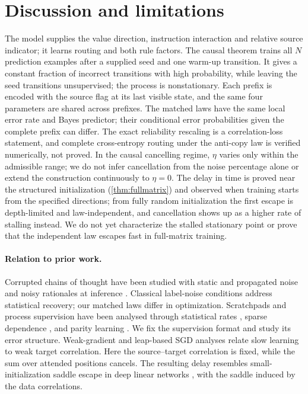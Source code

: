 \section{Discussion and limitations}
\label{sec:scope}
The model supplies the value direction, instruction interaction and relative source indicator; it learns routing and both rule factors.
The causal theorem trains all $N$ prediction examples after a supplied seed and one warm-up transition.
It gives a constant fraction of incorrect transitions with high probability, while leaving the seed transitions unsupervised; the process is nonstationary.
Each prefix is encoded with the source flag at its last visible state, and the same four parameters are shared across prefixes.
The matched laws have the same local error rate and Bayes predictor; their conditional error probabilities given the complete prefix can differ.
The exact reliability rescaling is a correlation-loss statement, and complete cross-entropy routing under the anti-copy law is verified numerically, not proved.
In the causal cancelling regime, $\eta$ varies only within the admissible range;
we do not infer cancellation from the noise percentage alone or extend the construction continuously to $\eta=0$.
The delay in time is proved near the structured initialization (\cref{thm:fullmatrix}) and observed when training starts from the specified directions;
from fully random initialization the first escape is depth-limited and law-independent, and cancellation shows up as a higher rate of stalling instead.
We do not yet characterize the stalled stationary point or prove that the independent law escapes fast in full-matrix training.

\paragraph{Relation to prior work.}
\label{sec:related}

Corrupted chains of thought have been studied with static and propagated noise \citep{havrilla2024noise}
and noisy rationales at inference \citep{zhou2024noisyrationales}. Classical label-noise conditions
\citep{natarajan2013noisy,patrini2017loss} address statistical recovery; our matched laws differ in optimization.
Scratchpads and process supervision \citep{nye2021scratchpads,wei2022cot,uesato2022solving,lightman2023verify}
have been analysed through statistical rates \citep{jia2025verify,hanneke2026samplecomplexityautoregressivereasoning},
sparse dependence \citep{wen2024sparse}, and parity learning \citep{kim2024parity}.
We fix the supervision format and study its error structure.
Weak-gradient \citep{shalevshwartz2017failures,abbe2025parities} and leap-based SGD analyses
\citep{abbe2021staircase,abbe2023sgd} relate slow learning to weak target correlation.
Here the source--target correlation is fixed, while the sum over attended positions cancels.
The resulting delay resembles small-initialization saddle escape in deep linear networks
\citep{saxe2014exact,shamir2019exponential}, with the saddle induced by the data correlations.

